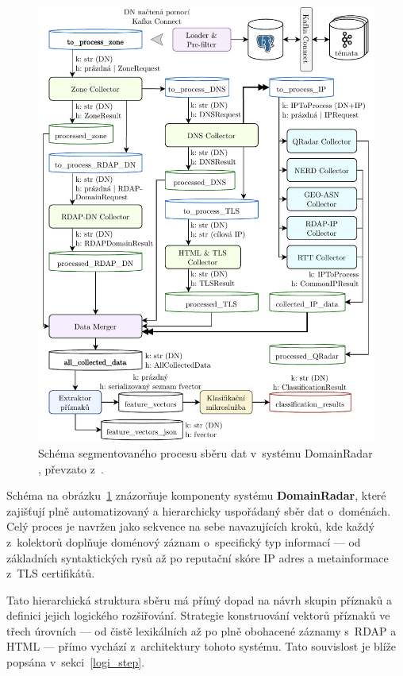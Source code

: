 \begin{figure}[!h]
    \centering
    \includegraphics[width=1.0\textwidth]{obrazky-figures/domainradar_colector.pdf}
    \caption{Schéma segmentovaného procesu sběru dat v~systému DomainRadar \cite{domainradar}, převzato z~\cite{oondra}.}
    \label{fig:domainradar_flow}
\end{figure}

Schéma na obrázku~\ref{fig:domainradar_flow} znázorňuje komponenty systému \textbf{DomainRadar}, které zajišťují plně automatizovaný a hierarchicky uspořádaný sběr dat o~doménách. Celý proces je navržen jako sekvence na sebe navazujících kroků, kde každý z~kolektorů doplňuje doménový záznam o~specifický typ informací — od základních syntaktických rysů až po reputační skóre IP adres a metainformace z~TLS certifikátů.

Tato hierarchická struktura sběru má přímý dopad na návrh skupin příznaků a definici jejich logického rozšiřování. Strategie konstruování vektorů příznaků ve třech úrovních — od čistě lexikálních až po plně obohacené záznamy s~RDAP a HTML — přímo vychází z~architektury tohoto systému. Tato souvislost je blíže popsána v~sekci~\ref{logi_step}.

